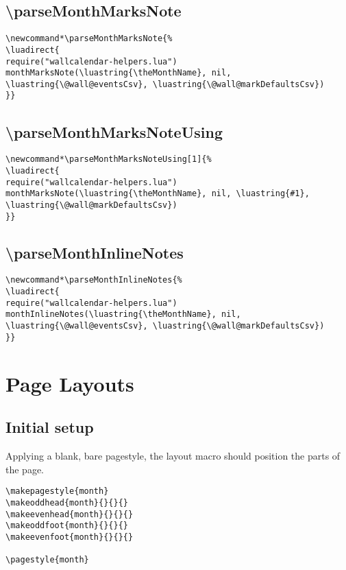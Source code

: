 \documentclass[11pt,oneside]{memoir-article}
\begin{document}
\section{\textbackslash parseMonthMarksNote}
\label{sec:org0e418a2}

\begin{verbatim}
\newcommand*\parseMonthMarksNote{%
\luadirect{
require("wallcalendar-helpers.lua")
monthMarksNote(\luastring{\theMonthName}, nil, \luastring{\@wall@eventsCsv}, \luastring{\@wall@markDefaultsCsv})
}}
\end{verbatim}

\section{\textbackslash parseMonthMarksNoteUsing}
\label{sec:org3748de7}

\begin{verbatim}
\newcommand*\parseMonthMarksNoteUsing[1]{%
\luadirect{
require("wallcalendar-helpers.lua")
monthMarksNote(\luastring{\theMonthName}, nil, \luastring{#1}, \luastring{\@wall@markDefaultsCsv})
}}
\end{verbatim}

\section{\textbackslash parseMonthInlineNotes}
\label{sec:orgf453ccf}

\begin{verbatim}
\newcommand*\parseMonthInlineNotes{%
\luadirect{
require("wallcalendar-helpers.lua")
monthInlineNotes(\luastring{\theMonthName}, nil, \luastring{\@wall@eventsCsv}, \luastring{\@wall@markDefaultsCsv})
}}
\end{verbatim}

\chapter{Page Layouts}
\label{sec:org0f79934}
\section{Initial setup}
\label{sec:org1a36c23}

Applying a blank, bare pagestyle, the layout macro should position the parts of
the page.

\begin{verbatim}
\makepagestyle{month}
\makeoddhead{month}{}{}{}
\makeevenhead{month}{}{}{}
\makeoddfoot{month}{}{}{}
\makeevenfoot{month}{}{}{}

\pagestyle{month}
\end{verbatim}
\end{document}
